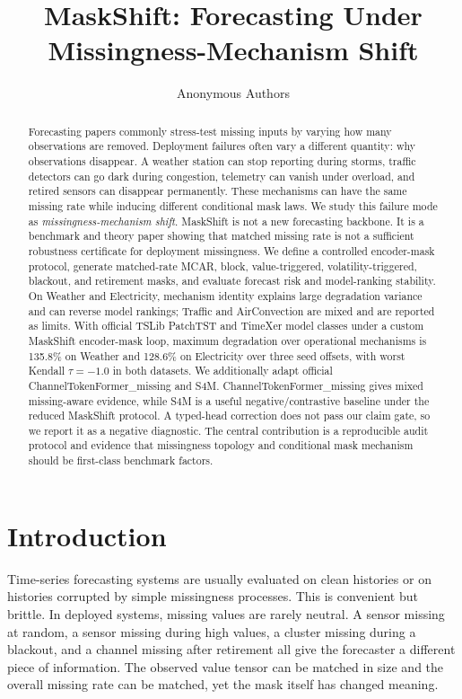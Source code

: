 \documentclass[10pt]{article}
\title{MaskShift: Forecasting Under Missingness-Mechanism Shift}
\author{Anonymous Authors}
\date{}
\begin{document}
\maketitle

\begin{abstract}
Forecasting papers commonly stress-test missing inputs by varying how many observations are removed. Deployment failures often vary a different quantity: why observations disappear. A weather station can stop reporting during storms, traffic detectors can go dark during congestion, telemetry can vanish under overload, and retired sensors can disappear permanently. These mechanisms can have the same missing rate while inducing different conditional mask laws. We study this failure mode as \emph{missingness-mechanism shift}. MaskShift is not a new forecasting backbone. It is a benchmark and theory paper showing that matched missing rate is not a sufficient robustness certificate for deployment missingness. We define a controlled encoder-mask protocol, generate matched-rate MCAR, block, value-triggered, volatility-triggered, blackout, and retirement masks, and evaluate forecast risk and model-ranking stability. On Weather and Electricity, mechanism identity explains large degradation variance and can reverse model rankings; Traffic and AirConvection are mixed and are reported as limits. With official TSLib PatchTST and TimeXer model classes under a custom MaskShift encoder-mask loop, maximum degradation over operational mechanisms is 135.8\% on Weather and 128.6\% on Electricity over three seed offsets, with worst Kendall $\tau=-1.0$ in both datasets. We additionally adapt official ChannelTokenFormer\_missing and S4M. ChannelTokenFormer\_missing gives mixed missing-aware evidence, while S4M is a useful negative/contrastive baseline under the reduced MaskShift protocol. A typed-head correction does not pass our claim gate, so we report it as a negative diagnostic. The central contribution is a reproducible audit protocol and evidence that missingness topology and conditional mask mechanism should be first-class benchmark factors.
\end{abstract}

\section{Introduction}

Time-series forecasting systems are usually evaluated on clean histories or on histories corrupted by simple missingness processes. This is convenient but brittle. In deployed systems, missing values are rarely neutral. A sensor missing at random, a sensor missing during high values, a cluster missing during a blackout, and a channel missing after retirement all give the forecaster a different piece of information. The observed value tensor can be matched in size and the overall missing rate can be matched, yet the mask itself has changed meaning.
\end{document}
